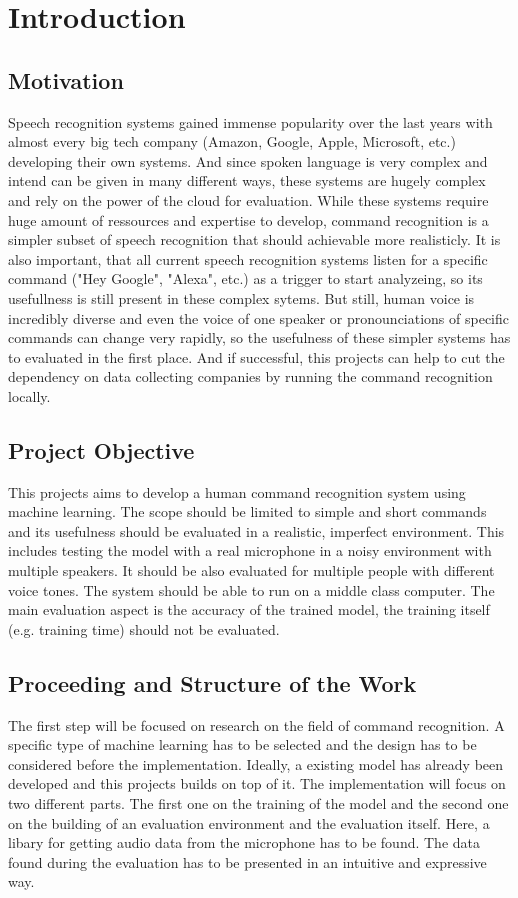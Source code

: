 \chapter{Introduction}

\section{Motivation}
Speech recognition systems gained immense popularity over the last years with almost every big tech company (Amazon, Google, Apple, Microsoft, etc.)
developing their own systems. And since spoken language is very complex and intend can be given in many different ways, these systems are hugely complex
and rely on the power of the cloud for evaluation. While these systems require huge amount of ressources and expertise to develop, command recognition 
is a simpler subset of speech recognition that should achievable more realisticly. It is also important, that all current speech recognition systems listen
for a specific command ("Hey Google", "Alexa", etc.) as a trigger to start analyzeing, so its usefullness is still present in these complex sytems.
But still, human voice is incredibly diverse and even the voice of one speaker or pronounciations of specific commands can change very rapidly, so the
usefulness of these simpler systems has to evaluated in the first place. And if successful, this projects can help to cut the dependency on data collecting companies
by running the command recognition locally.

\section{Project Objective}
This projects aims to develop a human command recognition system using machine learning. The scope should be limited to
simple and short commands and its usefulness should be evaluated in a realistic, imperfect environment. This includes testing 
the model with a real microphone in a noisy environment with multiple speakers. It should be also evaluated for multiple people
with different voice tones. The system should be able to run on a middle class computer. The main evaluation aspect is the accuracy of the trained
model, the training itself (e.g. training time) should not be evaluated.

\section{Proceeding and Structure of the Work}
The first step will be focused on research on the field of command recognition. A specific type of machine learning has to be selected and
the design has to be considered before the implementation. Ideally, a existing model has already been developed and this projects builds on top of it.
The implementation will focus on two different parts. The first one on the training of the model and the second one on the building
of an evaluation environment and the evaluation itself. Here, a libary for getting audio data from the microphone has to be found. The data found
during the evaluation has to be presented in an intuitive and expressive way.